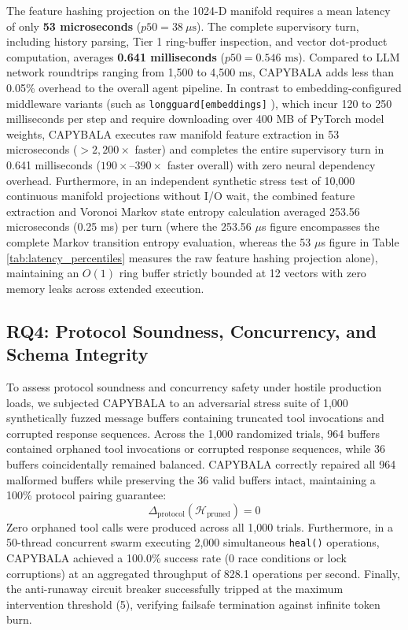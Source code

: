 \documentclass[journal]{IEEEtran}
\begin{document}
The feature hashing projection on the 1024-D manifold requires a mean latency of only \textbf{53 microseconds} ($p50 = 38\ \mu\text{s}$). The complete supervisory turn, including history parsing, Tier 1 ring-buffer inspection, and vector dot-product computation, averages \textbf{0.641 milliseconds} ($p50 = 0.546\text{ ms}$). Compared to LLM network roundtrips ranging from 1,500 to 4,500 ms, CAPYBALA adds less than 0.05\% overhead to the overall agent pipeline. In contrast to embedding-configured middleware variants (such as \texttt{longguard[embeddings]} \cite{longguard2024}), which incur 120 to 250 milliseconds per step and require downloading over 400 MB of PyTorch model weights, CAPYBALA executes raw manifold feature extraction in 53 microseconds ($> 2,200\times$ faster) and completes the entire supervisory turn in 0.641 milliseconds ($190\times\text{--}390\times$ faster overall) with zero neural dependency overhead. Furthermore, in an independent synthetic stress test of 10,000 continuous manifold projections without I/O wait, the combined feature extraction and Voronoi Markov state entropy calculation averaged 253.56 microseconds (0.25 ms) per turn (where the 253.56 $\mu$s figure encompasses the complete Markov transition entropy evaluation, whereas the 53 $\mu$s figure in Table \ref{tab:latency_percentiles} measures the raw feature hashing projection alone), maintaining an $O(1)$ ring buffer strictly bounded at 12 vectors with zero memory leaks across extended execution.

\subsection{RQ4: Protocol Soundness, Concurrency, and Schema Integrity}

To assess protocol soundness and concurrency safety under hostile production loads, we subjected CAPYBALA to an adversarial stress suite of 1,000 synthetically fuzzed message buffers containing truncated tool invocations and corrupted response sequences. Across the 1,000 randomized trials, 964 buffers contained orphaned tool invocations or corrupted response sequences, while 36 buffers coincidentally remained balanced. CAPYBALA correctly repaired all 964 malformed buffers while preserving the 36 valid buffers intact, maintaining a 100\% protocol pairing guarantee:
\begin{equation}
\Delta_{\text{protocol}}(\mathcal{H}_{\text{pruned}}) = 0
\end{equation}
Zero orphaned tool calls were produced across all 1,000 trials. Furthermore, in a 50-thread concurrent swarm executing 2,000 simultaneous \texttt{heal()} operations, CAPYBALA achieved a 100.0\% success rate (0 race conditions or lock corruptions) at an aggregated throughput of 828.1 operations per second. Finally, the anti-runaway circuit breaker successfully tripped at the maximum intervention threshold (5), verifying failsafe termination against infinite token burn.
\end{document}

